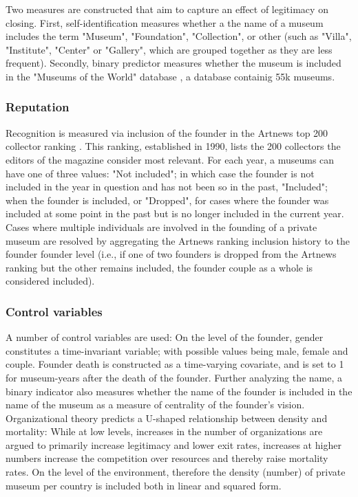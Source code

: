 \documentclass[11pt]{article}
\begin{document}
Two measures are constructed that aim to capture an effect of legitimacy on closing.
First, self-identification measures whether a the name of a museum includes the term "Museum", "Foundation", "Collection", or other (such as "Villa", "Institute", "Center" or "Gallery", which are grouped together as they are less frequent).
Secondly, binary predictor measures whether the museum is included in the "Museums of the World" database \parencite{deGruyter_2021_MOW}, a database containig 55k museums.




\subsubsection*{Reputation}


Recognition is measured via inclusion of the founder in the Artnews top 200 collector ranking \parencite{Artnews_ranking}.
This ranking, established in 1990, lists the 200 collectors the editors of the magazine consider most relevant.
For each year, a museums can have one of three values: "Not included"; in which case the founder is not included in the year in question and has not been so in the past, "Included"; when the founder is included, or "Dropped", for cases where the founder was included at some point in the past but is no longer included in the current year.
Cases where multiple individuals are involved in the founding of a private museum are resolved by aggregating the Artnews ranking inclusion history to the founder founder level (i.e., if one of two founders is dropped from the Artnews ranking but the other remains included, the founder couple as a whole is considered included).





\subsubsection*{Control variables}


\bigbreak
\noindent
A number of control variables are used: 
On the level of the founder, gender constitutes a time-invariant variable; with possible values being male, female and couple.
Founder death is constructed as a time-varying covariate, and is set to 1 for museum-years after the death of the founder. 
Further analyzing the name, a binary indicator also measures whether the name of the founder is included in the name of the museum as a measure of centrality of the founder's vision.
Organizational theory \parencite{hannan89_organ} predicts a U-shaped relationship between density and mortality:
While at low levels, increases in the number of organizations are argued to primarily increase legitimacy and lower exit rates, increases at higher numbers increase the competition over resources and thereby raise mortality rates.
On the level of the environment, therefore the density (number) of private museum per country is included both in linear and squared form.
\end{document}
